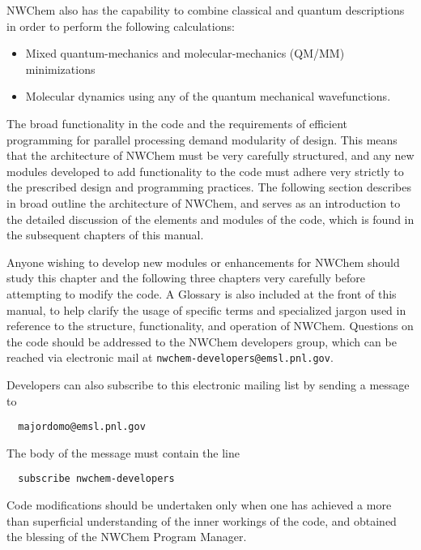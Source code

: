 NWChem also has the capability to combine classical and quantum
descriptions in order to perform the following calculations:
\begin{itemize}
\item Mixed quantum-mechanics and molecular-mechanics (QM/MM)
  minimizations
\item Molecular dynamics using any of the quantum
  mechanical wavefunctions.
\end{itemize}


The broad functionality in the code and the requirements of efficient programming
for parallel processing demand modularity of design.  This means that the
architecture of NWChem must be very carefully structured, and any new modules
developed to add functionality to the code must adhere 
very strictly to the prescribed design and
programming practices. The following section describes in broad outline the 
architecture of NWChem, and serves as an introduction to the detailed
discussion of the elements and modules of the code, which is found in the
subsequent chapters of this manual.

Anyone wishing to develop new modules or enhancements for NWChem should study
this chapter and the following three chapters very carefully before attempting
to modify the code.  A Glossary is also included at the front of this manual,
to help clarify the usage of specific terms and specialized jargon used in
reference to the structure, functionality, and operation of NWChem.
Questions on the code should be addressed to the NWChem developers group,
which can be reached via electronic mail at \verb+nwchem-developers@emsl.pnl.gov+.

Developers can also subscribe to this electronic mailing list 
by sending a message to 
\begin{verbatim}
  majordomo@emsl.pnl.gov
\end{verbatim}
The body of the message must contain the line 
\begin{verbatim}
  subscribe nwchem-developers
\end{verbatim}


Code modifications should be undertaken only when one has achieved a more
than superficial understanding of the inner workings of the code, and obtained the
blessing of the NWChem Program Manager.
